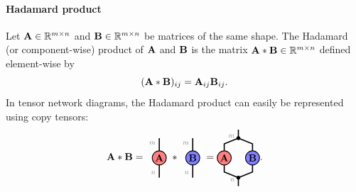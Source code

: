 \paragraph{Hadamard product}
Let $\mathbf{A}\in\mathbb{R}^{m\times n}$ and $\mathbf{B}\in\mathbb{R}^{m\times n}$ be matrices of the same shape. The Hadamard (or component-wise) product of $\mathbf{A}$ and $\mathbf{B}$ is the matrix  $\mathbf{A}*\mathbf{B}\in\mathbb{R}^{m\times n}$ defined element-wise by 
$$(\mathbf{A}*\mathbf{B})_{ij} = \mathbf{A}_{ij}\mathbf{B}_{ij}.$$
In tensor network diagrams, the Hadamard product can easily be represented using copy tensors:
\begin{equation*}
\Ab\hadam\Bb =
     \begin{tikzpicture}[baseline=\baseline]
    \tikzset{tensor/.style = {minimum size = 0.5cm,shape = circle,thick,draw=black,inner sep = 0pt}, edge/.style   = {thick,line width=.4mm},every loop/.style={}}
    \def\y{0}
    \def\x{0}
    \draw[edge] (\x,\y-0.7) -- (\x,\y+0.7)  node [very near end,left] {\edgelabel{$m$}} node [very near start,left] {\edgelabel{$n$}} ;
    \node[tensor,fill=red!50!white] (A) at (\x,\y){$\Ab$};
    \end{tikzpicture} 
    \ \hadam %
    \begin{tikzpicture}[baseline=\baseline]
    \tikzset{tensor/.style = {minimum size = 0.5cm,shape = circle,thick,draw=black,inner sep = 0pt}, edge/.style   = {thick,line width=.4mm},every loop/.style={}}
    \def\y{0}
    \def\x{0}
    \draw[edge] (\x,\y-0.7) -- (\x,\y+0.7)node [very near end,left] {\edgelabel{$m$}} node [very near start,left] {\edgelabel{$n$}} ;
    \node[tensor,fill=blue!50!white] (B) at (\x,\y){$\Bb$};
    \end{tikzpicture}
\ =
\begin{tikzpicture}[baseline=\baseline]
    \tikzset{tensor/.style = {minimum size = 0.5cm,shape = circle,thick,draw=black,inner sep = 0pt}, edge/.style   = {thick,line width=.4mm},every loop/.style={}}
    \def\y{0}
    \def\x{0}
    \node[tensor,fill=red!50!white] (A) at (\x,\y){$\Ab$};
    \node[tensor,fill=blue!50!white] (B) at (\x+1,\y){$\Bb$};
    \draw[edge] (\x,\y+0.25) -- (\x,\y+0.5) -- (\x+0.5,\y+0.7);
    \draw[edge] (\x+1,\y+0.25) -- (\x+1,\y+0.5) -- (\x+0.5,\y+0.7);
    \draw[edge] (\x+0.5,\y+0.7) -- (\x+0.5,\y+1) node [near start,left] {\edgelabel{$m$}};
    \draw  node[fill = black,circle,inner sep=0pt,minimum size=4pt] (m) at (\x+0.5,\y+0.7) {};
    \draw[edge] (\x,\y-0.25) -- (\x,\y-0.5) -- (\x+0.5,\y-0.7);
    \draw[edge] (\x+1,\y-0.25) -- (\x+1,\y-0.5) -- (\x+0.5,\y-0.7);
    \draw[edge] (\x+0.5,\y-0.7) -- (\x+0.5,\y-1) node [near start,left] {\edgelabel{$n$}};
    \draw  node[fill = black,circle,inner sep=0pt,minimum size=4pt] (m) at (\x+0.5,\y-0.7) {};
\end{tikzpicture}.
\end{equation*}
